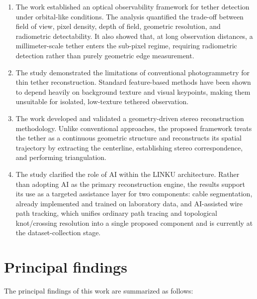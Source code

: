 \begin{enumerate}
    \item The work established an optical observability framework for tether detection under orbital-like conditions. The analysis quantified the trade-off between field of view, pixel density, depth of field, geometric resolution, and radiometric detectability. It also showed that, at long observation distances, a millimeter-scale tether enters the sub-pixel regime, requiring radiometric detection rather than purely geometric edge measurement.
    \item The study demonstrated the limitations of conventional photogrammetry for thin tether reconstruction. Standard feature-based methods have been shown to depend heavily on background texture and visual keypoints, making them unsuitable for isolated, low-texture tethered observation.
    \item The work developed and validated a geometry-driven stereo reconstruction methodology. Unlike conventional approaches, the proposed framework treats the tether as a continuous geometric structure and reconstructs its spatial trajectory by extracting the centerline, establishing stereo correspondence, and performing triangulation.
    \item The study clarified the role of AI within the LINKU architecture. Rather than adopting AI as the primary reconstruction engine, the results support its use as a targeted assistance layer for two components: cable segmentation, already implemented and trained on laboratory data, and AI-assisted wire path tracking, which unifies ordinary path tracing and topological knot/crossing resolution into a single proposed component and is currently at the dataset-collection stage.
\end{enumerate}

\section{Principal findings}

The principal findings of this work are summarized as follows:
\\\\

